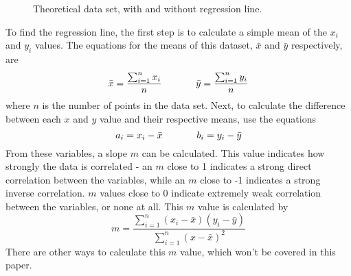 \documentclass[11pt]{article}
\begin{document}
\pgfplotsset{width=7cm,compat=1.9}
\begin{figure}
\centering
{}
\caption{Theoretical data set, with and without regression line.}
\label{fakedata}
\end{figure}

To find the regression line, the first step is to calculate a simple mean
of the $x_i$ and $y_i$ values. The equations for the means of this dataset,
$\bar{x}$ and $\bar{y}$ respectively, are
\begin{equation*}
\bar{x} = \frac{\sum_{i=1}^{n}x_i}{n}\hphantom{++++}
\bar{y} = \frac{\sum_{i=1}^{n}y_i}{n}
\end{equation*}
where $n$ is the number of points in the data set. Next, to calculate
the difference between each $x$ and $y$ value and their respective
means, use the equations
\begin{equation*}
a_i = x_i - \bar{x}\hphantom{++++}
b_i = y_i - \bar{y}
\end{equation*}
From these variables, a slope $m$ can be calculated. This value
indicates how strongly the data is correlated - an $m$ close to 1
indicates a strong direct correlation between the variables, while an
$m$ close to -1 indicates a strong inverse correlation. $m$ values
close to 0 indicate extremely weak correlation between the variables,
or none at all. This $m$ value is calculated by
\begin{equation*}
m = \frac{\sum_{i=1}^{n}(x_i-\bar{x})(y_i-\bar{y})}{\sum_{i=1}^{n}(x-\bar{x})^2}
\end{equation*}
There are other ways to calculate this $m$ value, which won't be
covered in this paper.
\end{document}
